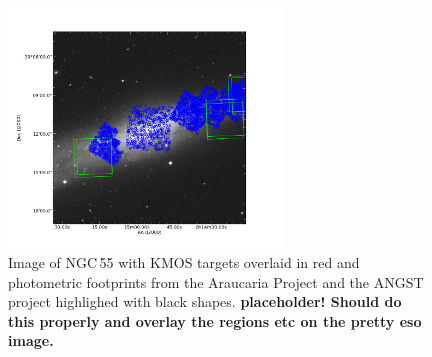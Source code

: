 \begin{figure}
 \centering
 \includegraphics[width=0.65\textwidth]{ngc55/ngc55_fields}
 \caption[Image of NGC\,55 with KMOS targets and photometric footprints highlighted]{
          Image of NGC\,55 with KMOS targets overlaid in red and photometric footprints from the Araucaria Project
          \protect\citep{2005Msngr.121...23G} and the ANGST project
          \protect\citep{2009ApJS..183...67D} highlighed with black shapes.
          \textbf{placeholder! Should do this properly and overlay the regions etc on the pretty eso image.}
         }
 \label{fig:ngc55}
\end{figure}

